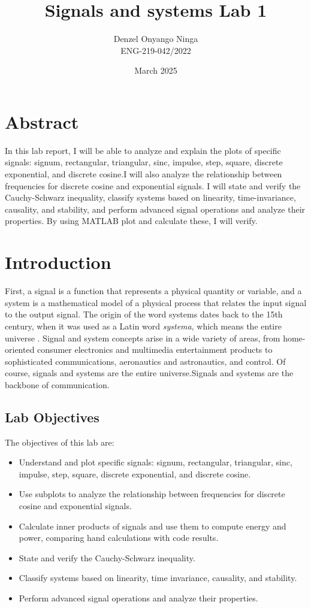 \documentclass[10pt, twocolumn]{article}
\title{Signals and systems Lab 1}
\author{Denzel Onyango Ninga \\ ENG-219-042/2022}
\date{March 2025}
\begin{document}
\maketitle

\section{Abstract}
In this lab report, I will be able to analyze and explain the plots of specific signals: signum, rectangular, triangular, sinc, impulse,
step, square, discrete exponential, and discrete cosine.I will also analyze the relationship between frequencies for discrete cosine and exponential signals. I will state and verify the Cauchy-Schwarz inequality, classify systems based on linearity, time-invariance, causality, and stability, and perform advanced signal operations and analyze their properties. By using MATLAB plot and calculate these, I will verify.
\section{Introduction}
First, a signal is a function that represents a physical quantity or variable, and a system is a mathematical model of a physical process that relates the input signal to the output signal. 
The origin of the word systems dates back to the 15th century,
when it was used as a Latin word \textit{systema},
which means the entire universe \cite[p.~19]{vural2022signals}. 
Signal and system concepts arise in a wide variety of areas, from home-oriented consumer electronics and multimedia entertainment products to sophisticated communications, aeronautics and astronautics, and control. Of course, signals and systems are the entire universe.Signals and systems are the backbone of communication.
\subsection{Lab Objectives}
The objectives of this lab are:
\begin{itemize}
    \item Understand and plot specific signals: signum, rectangular, triangular, sinc, impulse, step, square, discrete exponential, and discrete cosine.
    \item Use subplots to analyze the relationship between frequencies for discrete cosine and exponential signals.
    \item Calculate inner products of signals and use them to compute energy and power, comparing hand calculations with code results.
    \item State and verify the Cauchy-Schwarz inequality.
    \item Classify systems based on linearity, time invariance, causality, and stability.
    \item Perform advanced signal operations and analyze their properties.
\end{itemize}
\end{document}
